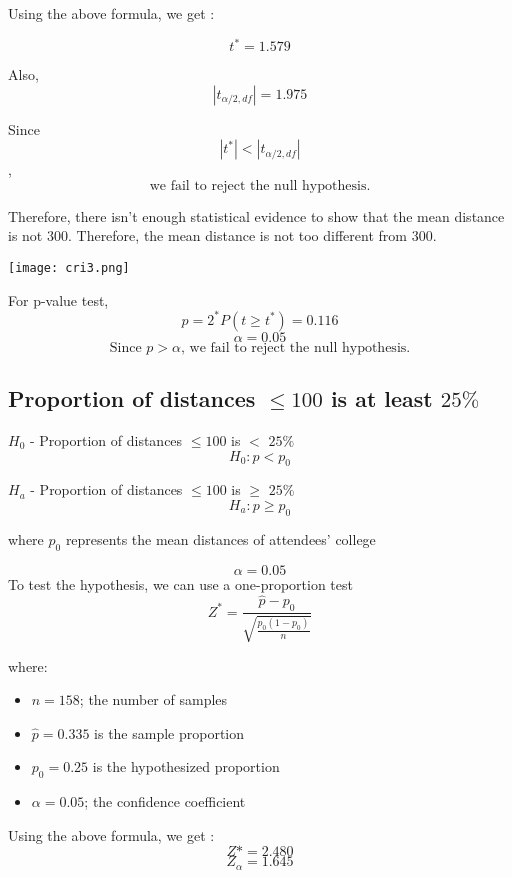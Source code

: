 \documentclass[oneside]{book}
\begin{document}
\large Using the above formula, we get :

\[ t^* = 1.579\]

Also,
\[|t_{\alpha/2, df}| = 1.975\] 

Since 
\[ |t^*| < |t_{\alpha/2, df}|\],
\[\text{we fail to reject the null hypothesis.}\]

Therefore, there isn't enough statistical evidence to show that the mean distance is not $300$. Therefore, the mean distance is not too different from $300$.

\begin{minipage}{\textwidth}
    \centering
    \texttt{[image: cri3.png]}
    \label{fig:enter-label}
\end{minipage}

For p-value test,
\[p = 2^*P(t \geq t^*) = 0.116\]
\[\alpha = 0.05\]
\[\text{Since $p > \alpha$, we fail to reject the null hypothesis.}\]

\subsection{Proportion of distances $\leq 100$ is at least $25\%$}
\begin{center}
\large $H_0$ - Proportion of distances $\leq 100$ is $<$ $25\%$
\[ H_0: p < p_0\]
\end{center}
\begin{center}
\large $H_a$ - Proportion of distances $\leq 100$ is $\geq$ $25\%$
\[ H_a: p \geq p_0 \]

where $p_0$ represents the mean distances of attendees' college 
\end{center}
\[ \alpha = 0.05\]
To test the hypothesis, we can use a one-proportion test
\[ Z^* = \frac{\hat{p} - p_0}{\sqrt{\frac{p_0(1 - p_0)}{n}}} \]

where:

\begin{itemize}
    \item $n = 158$; the number of samples
    \item $\hat{p} = 0.335$ is the sample proportion
    \item $p_0 = 0.25$ is the hypothesized proportion
    \item $\alpha = 0.05$; the confidence coefficient
\end{itemize}

\large Using the above formula, we get :
\[ Z* = 2.480\]
\[ Z_{\alpha} = 1.645\]
\end{document}
